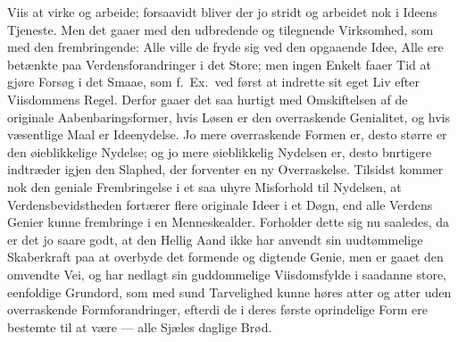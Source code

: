 \documentclass[12pt,a4paper]{book}
\begin{document}
Viis at virke og arbeide; forsaavidt bliver der jo stridt
og arbeidet nok i Ideens Tjeneste. Men det gaaer med den udbredende og tilegnende
Virksomhed, som med den frembringende: Alle ville de fryde sig ved den opgaaende
Idee, Alle ere betænkte paa Verdensforandringer i det Store; men ingen Enkelt
faaer Tid at gjøre Forsøg i det Smaae, som f.\ Ex.\ ved først at indrette sit eget
Liv efter Viisdommens Regel. Derfor gaaer det saa hurtigt med Omskiftelsen af de
originale Aabenbaringsformer, hvis Løsen er den overraskende Genialitet, og hvis
væsentlige Maal er Ideenydelse. Jo mere overraskende Formen er, desto større er
den øieblikkelige Nydelse; og jo mere øieblikkelig Nydelsen er, desto
bnrtigere indtræder igjen den Slaphed, der forventer en ny Overraskelse. Tilsidst
kommer nok den geniale Frembringelse i et saa uhyre Misforhold til Nydelsen, at
Verdensbevidstheden fortærer flere originale Ideer i et Døgn, end alle Verdens
Genier kunne frembringe i en Menneskealder. Forholder dette sig nu saaledes, da er
det jo saare godt, at den Hellig Aand ikke har anvendt sin uudtømmelige
Skaberkraft paa at overbyde det formende og digtende Genie, men er gaaet den
omvendte Vei, og har nedlagt sin guddommelige Viisdomsfylde i saadanne store,
eenfoldige Grundord, som med sund Tarvelighed kunne høres atter og atter uden
overraskende Formforandringer, efterdi de i deres første oprindelige Form ere
bestemte til at være --- alle Sjæles daglige Brød.
\end{document}
